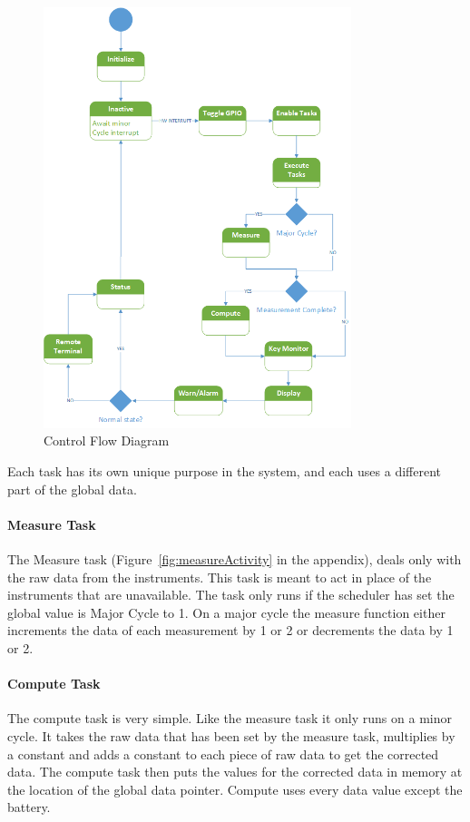 \documentclass[12pt]{article} %
\begin{document}
    \begin{figure}[h]
      \centering
      \includegraphics[width=0.8\textwidth]{../design/Control_state_diagram.png}
      \caption{Control Flow Diagram}
      \label{fig:Control}
    \end{figure}

    Each task has its own unique purpose in the system, and each uses a different
    part of the global data.

    \paragraph{Measure Task}
    The Measure task (Figure~\ref{fig:measureActivity} in the
    appendix), deals only with the raw data from the instruments. This task is
    meant to act in place of the instruments that are unavailable. The task only
    runs if the scheduler has set the global value is Major Cycle to 1. On a major
    cycle the measure function either increments the data of each measurement by 1
    or 2 or decrements the data by 1 or 2.

    \paragraph{Compute Task}
    The compute task is very simple. Like the measure task it only runs on a minor
    cycle. It takes the raw data that has been set by the measure task, multiplies
    by a constant and adds a constant to each piece of raw data to get the
    corrected data. The compute task then puts the values for the corrected data in
    memory at the location of the global data pointer. Compute uses every data
    value except the battery.
\end{document}
